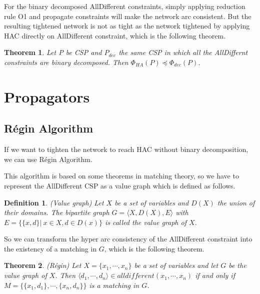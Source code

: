 \documentclass[a4paper, 12pt]{report}
\newtheorem{definition}{Definition}[subsection]
\newtheorem{theorem}{Theorem}[subsection]
\begin{document}
            For the binary decomposed AllDifferent constraints, simply applying reduction rule O1 and propagate constraints will make the network arc consistent. But the resulting tightened network is not as tight as the network tightened by applying HAC directly on AllDifferent constraint, which is the following theorem.

            \begin{theorem}
                Let P be CSP and $P_{dec}$ the same CSP in which all the AllDiffernt constraints are binary decomposed. Then $\Phi_{HA}(P)\preceq \Phi_{dec}(P)$.
            \end{theorem}

        
     \section {Propagators}

         \subsection{Régin Algorithm}

            If we want to tighten the network to reach HAC without binary decomposition, we can use Régin Algorithm\cite{regin1994filtering, anastasatospropagation}.

            This algorithm is based on some theorems in matching theory, so we have to represent the AllDifferent CSP as a value graph which is defined as follows.

            \begin{definition}
                (Value graph) Let $X$ be a set of variables and $D(X)$ the union of their domains. The bipartite graph $G=\langle X,D(X),E\rangle$ with $E=\{\{x,d\}|\ x\in X, d\in D(x)\}$ is called the value graph of $X$.
            \end{definition}
           
            So we can transform the hyper arc consistency of the AllDifferent constraint into the existency of a matching in $G$, which is the following theorem.

            \begin{theorem}
                (Régin\cite{regin1994filtering}) Let $X=\{x_1,\cdots,x_n\}$ be a set of variables and let $G$ be the value graph of $X$. Then $\langle d_1,\cdots,d_n\rangle\in alldifferent(x_1,\cdots,x_n)$ if and only if $M=\{\{x_1,d_1\},\cdots,\{x_n,d_n\}\}$ is a matching in $G$.
            \end{theorem}
\end{document}
